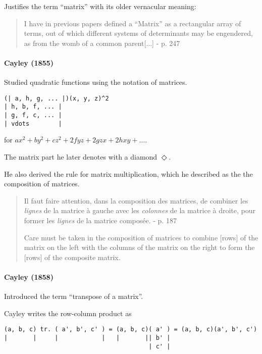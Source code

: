 Justifies the term ``matrix'' with its older vernacular meaning:

\begin{quote}
I have in previous papers defined a ``Matrix'' as a rectangular array of
terms, out of which different systems of determinants may be engendered,
as from the womb of a common parent[...] - p. 247
\end{quote}



\paragraph{Cayley (1855)~\cite{Cayley1855}}

Studied quadratic functions using the notation of matrices.

\begin{verbatim}
(| a, h, g, ... |)(x, y, z)^2
| h, b, f, ... |
| g, f, c, ... |
| vdots        |
\end{verbatim}

for $ax^2 + by^2 + cz^2 + 2fyz + 2gzx + 2hxy + \dots$.

The matrix part he later denotes with a diamond $\Diamond$.

He also derived the rule for matrix multiplication, which he described as the
the composition of matrices.
\begin{quote}
Il faut faire attention, dans la composition des matrices, de combiner les \textit{lignes}
de la matrice à gauche avec les \textit{colonnes} de la matrice à droite, pour former les
\textit{lignes} de la matrice composée.
- p. 187

Care must be taken in the composition of matrices to combine [rows]
of the matrix on the left with the columns of the matrix on the right to form the
[rows] of the composite matrix.
\end{quote}

\paragraph{Cayley (1858)~\cite{Cayley1858}}

Introduced the term ``transpose of a matrix''.

Cayley writes the row-column product as

\begin{verbatim}
(a, b, c) tr. ( a', b', c' ) = (a, b, c)( a' ) = (a, b, c)(a', b', c')
|       |     |            |   |       || b' |
                                        | c' |
\end{verbatim}

